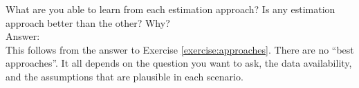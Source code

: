 \begin{exercise}
What are you able to learn from each estimation approach? Is any estimation approach better than the other? Why?\\
\noindent Answer:\\
\noindent This follows from the answer to Exercise \ref{exercise:approaches}. There are no ``best approaches''. It all depends on the question you want to ask, the data availability, and the assumptions that are plausible in each scenario.
\end{exercise}